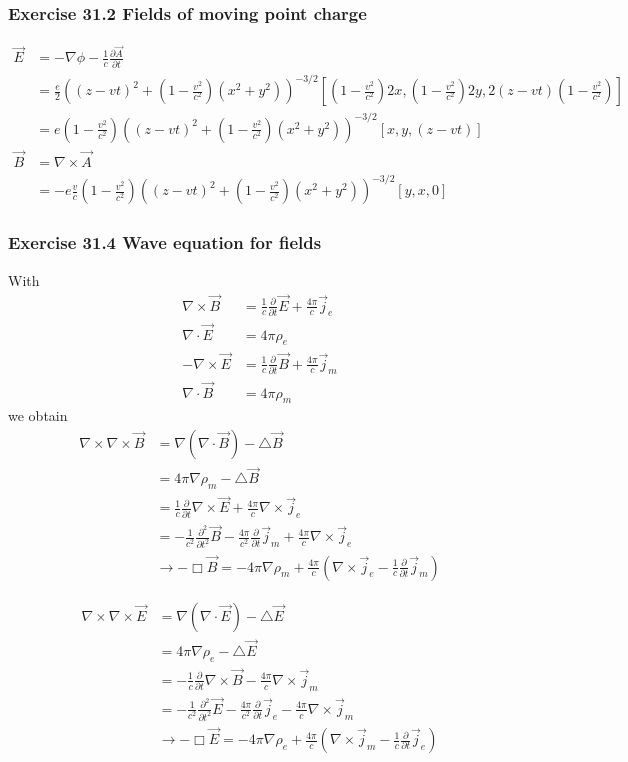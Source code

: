 \documentclass[10pt,a4paper]{article}
\theoremstyle{definition}
\begin{document}
\subsubsection{Exercise 31.2 Fields of moving point charge}
\begin{align}
	\vec{E}&=-\nabla\phi-\frac{1}{c}\frac{\partial\vec{A}}{\partial t}\\
	&=\frac{e}{2}\left((z-vt)^2+(1-\frac{v^2}{c^2})(x^2+y^2)\right)^{-3/2}[(1-\frac{v^2}{c^2})2x,(1-\frac{v^2}{c^2})2y,2(z-vt)(1-\frac{v^2}{c^2})]\\
	&=e(1-\frac{v^2}{c^2})\left((z-vt)^2+(1-\frac{v^2}{c^2})(x^2+y^2)\right)^{-3/2}[x,y,(z-vt)]\\
	\vec{B}&=\nabla\times\vec{A}\\
	&=-e\frac{v}{c}(1-\frac{v^2}{c^2})\left((z-vt)^2+(1-\frac{v^2}{c^2})(x^2+y^2)\right)^{-3/2}[y,x,0]
\end{align}

\subsubsection{Exercise 31.4 Wave equation for fields}
With
\begin{align}
\nabla\times\vec{B}&=\frac{1}{c}\frac{\partial}{\partial t}\vec{E}+\frac{4\pi}{c}\vec{j}_e\\
\nabla\cdot\vec{E}&=4\pi\rho_e\\
-\nabla\times\vec{E}&=\frac{1}{c}\frac{\partial}{\partial t}\vec{B}+\frac{4\pi}{c}\vec{j}_m\\
\nabla\cdot\vec{B}&=4\pi\rho_m
\end{align}
we obtain
\begin{align}
\nabla\times\nabla\times\vec{B}
&=\nabla(\nabla\cdot\vec{B})-\triangle\vec{B}\\
&=4\pi\nabla\rho_m-\triangle\vec{B}\\
&=\frac{1}{c}\frac{\partial}{\partial t}\nabla\times\vec{E}+\frac{4\pi}{c}\nabla\times\vec{j}_e\\
&=-\frac{1}{c^2}\frac{\partial^2}{\partial t^2}\vec{B}-\frac{4\pi}{c^2}\frac{\partial}{\partial t}\vec{j}_m+\frac{4\pi}{c}\nabla\times\vec{j}_e\\
&\rightarrow-\Box\vec{B}=-4\pi\nabla\rho_m+\frac{4\pi}{c}(\nabla\times\vec{j}_e-\frac{1}{c}\frac{\partial}{\partial t}\vec{j}_m)
\end{align}

\begin{align}
\nabla\times\nabla\times\vec{E}
&=\nabla(\nabla\cdot\vec{E})-\triangle\vec{E}\\
&=4\pi\nabla\rho_e-\triangle\vec{E}\\
&=-\frac{1}{c}\frac{\partial}{\partial t}\nabla\times\vec{B}-\frac{4\pi}{c}\nabla\times\vec{j}_m\\
&=-\frac{1}{c^2}\frac{\partial^2}{\partial t^2}\vec{E}-\frac{4\pi}{c^2}\frac{\partial}{\partial t}\vec{j}_e-\frac{4\pi}{c}\nabla\times\vec{j}_m\\
&\rightarrow-\Box\vec{E}=-4\pi\nabla\rho_e+\frac{4\pi}{c}(\nabla\times\vec{j}_m-\frac{1}{c}\frac{\partial}{\partial t}\vec{j}_e)
\end{align}
\end{document}
